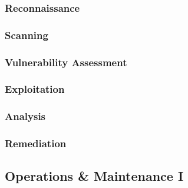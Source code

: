 \subsubsection{Reconnaissance}
\subsubsection{Scanning}
\subsubsection{Vulnerability Assessment}
\subsubsection{Exploitation}
\subsubsection{Analysis}
\subsubsection{Remediation}


\subsection{Operations \& Maintenance I}